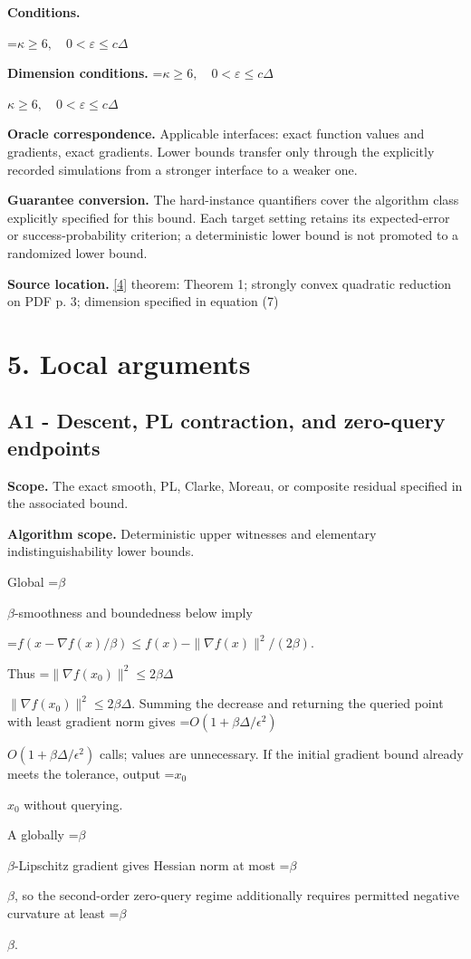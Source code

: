 \documentclass[10pt,a4paper]{article}
\newcommand{\AtlasMath}[1]{\par\begingroup\centering\setbox0=\hbox{$\displaystyle #1$}\ifdim\wd0>1.4\linewidth\typeout{ATLAS WIDE FORMULA: \the\wd0}\fi\ifdim\wd0>\linewidth\resizebox{\linewidth}{!}{\box0}\else\box0\fi\par\endgroup}
\newcommand{\AtlasInlineMath}[1]{\begingroup\setbox0=\hbox{$#1$}\ifdim\wd0>.4\linewidth\endgroup\AtlasMath{#1}\else\endgroup$#1$\fi}
\begin{document}
\textbf{Conditions.} 
\AtlasMath{\kappa\ge6,\quad0<\varepsilon\le c\Delta}


\textbf{Dimension conditions.} \AtlasInlineMath{\kappa\ge6,\quad0<\varepsilon\le c\Delta}

\textbf{Oracle correspondence.} Applicable interfaces: exact function values and gradients, exact gradients. Lower bounds transfer only through the explicitly recorded simulations from a stronger interface to a weaker one.

\textbf{Guarantee conversion.} The hard-instance quantifiers cover the algorithm class explicitly specified for this bound. Each target setting retains its expected-error or success-probability criterion; a deterministic lower bound is not promoted to a randomized lower bound.

\textbf{Source location.} \href{https://arxiv.org/pdf/2609.10874}{[4]} theorem: Theorem 1; strongly convex quadratic reduction on PDF p. 3; dimension specified in equation (7)

\section{5. Local arguments}
\subsection{A1 - Descent, PL contraction, and zero-query endpoints}
\textbf{Scope.} The exact smooth, PL, Clarke, Moreau, or composite residual specified in the associated bound.

\textbf{Algorithm scope.} Deterministic upper witnesses and elementary indistinguishability lower bounds.

Global \AtlasInlineMath{\beta}-smoothness and boundedness below imply

\AtlasMath{f(x-\nabla f(x)/\beta)\le f(x)-\|\nabla f(x)\|^2/(2\beta).}

Thus \AtlasInlineMath{\|\nabla f(x_0)\|^2\le2\beta\Delta}. Summing the decrease and returning the queried point with least gradient norm gives \AtlasInlineMath{O(1+\beta\Delta/\epsilon^2)} calls; values are unnecessary. If the initial gradient bound already meets the tolerance, output \AtlasInlineMath{x_0} without querying.

A globally \AtlasInlineMath{\beta}-Lipschitz gradient gives Hessian norm at most \AtlasInlineMath{\beta}, so the second-order zero-query regime additionally requires permitted negative curvature at least \AtlasInlineMath{\beta}.
\end{document}
